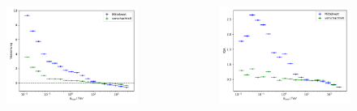 \documentclass[aspectratio=1610, professionalfonts, 9pt]{beamer}
\begin{document}
  \begin{frame}
    \begin{columns}
      \begin{figure}
        \includegraphics[width=\textwidth]{pictures/RF_nested_bias.pdf}
        \caption{}
        \label{}
      \end{figure}
      \begin{figure}
        \includegraphics[width=\textwidth]{pictures/RF_nested_resolution.pdf}
        \caption{}
        \label{}
      \end{figure}
    \end{columns}
  \end{frame}
\end{document}
